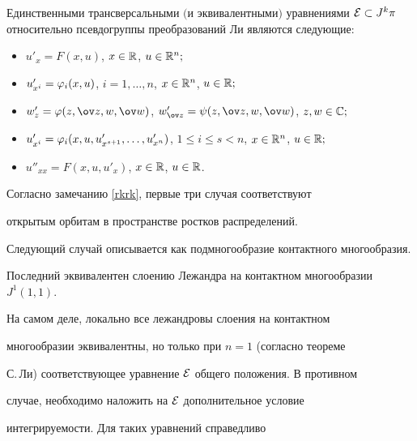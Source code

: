 \begin{thm}


Единственными трансверсальными $($и эквивалентными$)$ уравнениями $\E\subset


J^k\pi$ относительно псевдогруппы преобразований Ли являются следующие\/${:}$


\begin{itemize}


\item[1.] $u'_x=F(x,u)$, $x\in{\Bbb R}$, $u\in{\Bbb R}^n;$


\item[2.] $u'_{x^i}=\varphi_i(x,u)$, $i=1,\dotsc,n$, $x\in{\Bbb R}^n$, $u\in{\Bbb R};$


\item[3.] $w'_z=\vp(z,\ov z,w,\ov w)$, $w'_{\ov z}=\psi(z,\ov z,w,\ov


w)$, $z,w\in\CC;$


\item[4.]


$u'_{x^i}=\vp_i(x,u,u'_{x^{s+1}},\dotsc,u'_{x^n})$, $1\le i\le


s<n$, $x\in\R^n$, $u\in\R;$


\item[5.]


$u''_{xx}=F(x,u,u'_x)$, $x\in{\Bbb R}$, $u\in{\Bbb R}$.


\end{itemize}


\end{thm}





Согласно замечанию \ref{rkrk}, первые три случая соответствуют


открытым орбитам в пространстве ростков распределений.


Следующий случай описывается как подмногообразие контактного многообразия.


Последний эквивалентен слоению Лежандра на контактном многообразии $J^1(1,1)$.


На самом деле, локально все лежандровы слоения на контактном


многообразии эквивалентны, но только при $n=1$ (согласно теореме


С.\,Ли) соответствующее уравнение ${\cal E}$ общего положения. В противном


случае, необходимо наложить на ${\cal E}$ дополнительное условие


интегрируемости. Для таких уравнений справедливо





